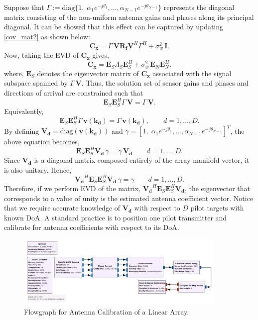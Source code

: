 \documentclass[a4paper, 11pt]{article}
\begin{document}
Suppose that $\Gamma := \mathrm{diag}\{1,\;\alpha_1 e^{-j\theta_1},\hdots,\alpha_{N-1} e^{-j\theta_{N-1}}\}$ represents the diagonal matrix consisting of the non-uniform antenna gains and phases along its principal diagonal. It can be showed that this effect can be captured by updating \eqref{cov_mat2} as shown below:
\begin{equation}
\mathbf{C_x} = \Gamma\,\mathbf{V}\mathbf{R_f}\mathbf{V}^H\Gamma^H+\sigma_w^2\,\mathbf{I}. 
\label{cov_mat_ant}
\end{equation}
Now, taking the EVD of $\mathbf{C_x}$ gives,
\begin{equation}
\mathbf{C_x} = \mathbf{E}_S\Lambda_S\mathbf{E}_S^H+\sigma_w^2\,\mathbf{E}_N\mathbf{E}_N^H.
\end{equation}
where, $\mathbf{E}_S$ denotes the eigenvector matrix of $\mathbf{C_x}$ associated with the signal subspace spanned by $\Gamma\,\mathbf{V}$. Thus, the solution set of sensor gains and phases and directions of arrival are constrained such that 
\begin{equation*}
\mathbf{E}_S\mathbf{E}_S^H\Gamma\,\mathbf{V} = \Gamma\,\mathbf{V}.
\end{equation*}
Equivalently, 
\begin{equation*}
\mathbf{E}_S\mathbf{E}_S^H\Gamma\,\mathbf{v(k_d)} = \Gamma\,\mathbf{v(k_d)},\qquad d = 1,\hdots,D. 
\end{equation*}
By defining $\mathbf{V_d}=\mathrm{diag}(\mathbf{v(k_d)})$ and $\gamma = [1,\;\alpha_1 e^{-j\theta_1},\hdots,\alpha_{N-1} e^{-j\theta_{N-1}}]^T$, the above equation becomes, 
\begin{equation*}
\mathbf{E}_S\mathbf{E}_S^H\mathbf{V_d}\,\gamma = \gamma\,\mathbf{V_d}\qquad d = 1,\hdots,D. 
\end{equation*}
Since $\mathbf{V_d}$ is a diagonal matrix composed entirely of the array-manifold vector, it is also unitary. Hence,  
\begin{equation*}
\mathbf{V_d}^H\mathbf{E}_S\mathbf{E}_S^H\mathbf{V_d}\,\gamma = \gamma\qquad d = 1,\hdots,D. 
\end{equation*}
Therefore, if we perform EVD of the matrix, $\mathbf{V_d}^H\mathbf{E}_S\mathbf{E}_S^H\mathbf{V_d}$, the eigenvector that corresponds to a value of unity is the estimated antenna coefficient vector. Notice that we require accurate knowledge of $\mathbf{V_d}$ with respect to $D$ pilot targets with known DoA. A standard practice is to position one pilot transmitter and calibrate for antenna coefficients with respect to its DoA. 
\begin{figure}[t!]
    \centering
    \includegraphics[width=0.9\textwidth]{figures/calib_lin_array_flowgraph.png}
    \caption{Flowgraph for Antenna Calibration of a Linear Array.}
    \label{calib_lin_array_flowgraph}
\end{figure}
\end{document}
